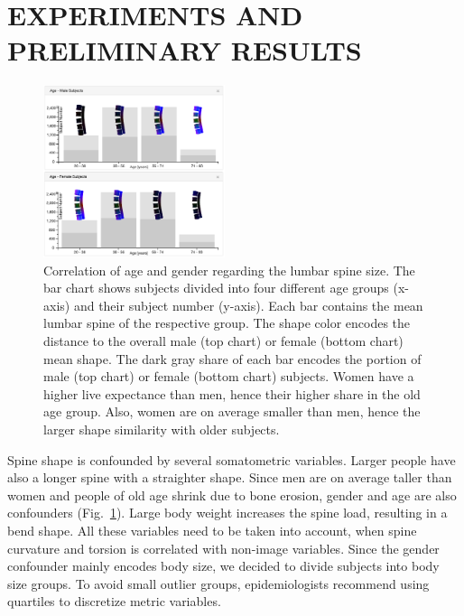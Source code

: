 \documentclass[a4paper,twoside]{style/article}
\begin{document}
\section{\uppercase{Experiments and Preliminary Results}}
\label{sec:Experiments}
\begin{figure}[!h]
  \centering
  \includegraphics[width=0.475\textwidth]{figures/age-gender}
  \caption{
	Correlation of age and gender regarding the lumbar spine size.
	The bar chart shows subjects divided into four different age groups (x-axis) and their subject number (y-axis).
	Each bar contains the mean lumbar spine of the respective group.
	The shape color encodes the distance to the overall male (top chart) or female (bottom chart) mean shape.
	The dark gray share of each bar encodes the portion of male (top chart) or female (bottom chart) subjects.
	Women have a higher live expectance than men, hence their higher share in the old age group.
	Also, women are on average smaller than men, hence the larger shape similarity with older subjects.
	}
  \label{fig:age-gender}
\end{figure}
\noindent Spine shape is confounded by several somatometric variables.
Larger people have also a longer spine with a straighter shape.
Since men are on average taller than women and people of old age shrink due to bone erosion, gender and age are also confounders (Fig.~\ref{fig:age-gender}).
Large body weight increases the spine load, resulting in a bend shape.
All these variables need to be taken into account, when spine curvature and torsion is correlated with non-image variables.
Since the gender confounder mainly encodes body size, we decided to divide subjects into body size groups.
To avoid small outlier groups, epidemiologists recommend using quartiles to discretize metric variables.
\end{document}
